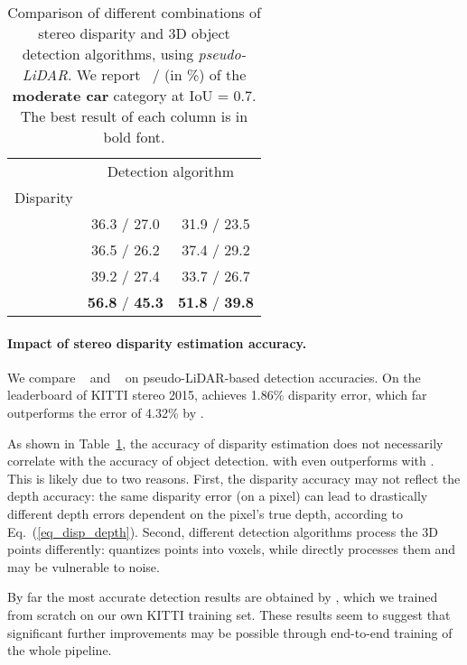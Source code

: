 \begin{table}
	\centering
	\caption{\small Comparison of different combinations of stereo disparity and 3D object detection algorithms, using \emph{pseudo-LiDAR}. We report \APBEV ~/ \AP (in \%) of the \textbf{moderate car} category at IoU = 0.7. The best result of each column is in bold font.} \label{tbDisp}
	\begin{tabular}{l|c|c}
		\multicolumn{1}{c|}{}  & \multicolumn{2}{c}{Detection algorithm} \\ \cline{2-3}
		\multicolumn{1}{c|}{Disparity} & \AVODGT & \Frustum \\ \hline
		\color{blue}\DispNetS &\color{blue} 36.3 / 27.0  &\color{blue} 31.9 / 23.5 \\
		\color{blue}\DispNetC  &\color{blue} 36.5 / 26.2 &\color{blue} 37.4 / 29.2\\
		\color{blue}\PSMNet  &\color{blue} 39.2 / 27.4 &\color{blue} 33.7 / 26.7 \\ \hline
		\color{blue}\PSMNetpd  &\color{blue} \textbf{56.8} / \textbf{45.3} &\color{blue} \textbf{51.8} / \textbf{39.8} \\
		\hline
	\end{tabular}
\end{table}

\paragraph{Impact of stereo disparity estimation accuracy.}

We compare \PSMNet~\cite{chang2018pyramid} and \DispNet~\cite{mayer2016large} on pseudo-LiDAR-based detection accuracies. On the leaderboard of KITTI stereo 2015, \PSMNet achieves 1.86\% disparity error, which far outperforms the error of 4.32\% by \DispNetC.

As shown in Table~\ref{tbDisp}, the accuracy of disparity estimation does not necessarily correlate with the accuracy of object detection. \Frustum with \DispNetC even outperforms \Frustum with \PSMNet.
This is likely due to two reasons. First, the disparity accuracy may not reflect the depth accuracy: the same disparity error (on a pixel) can lead to drastically different depth errors dependent on the pixel's true depth, according to Eq.~(\ref{eq_disp_depth}). Second, different detection algorithms process the 3D points differently: \AVOD quantizes points into voxels, while \Frustum directly processes them and may be vulnerable to noise. 

By far the most accurate detection results are obtained by \PSMNetpd, which we trained from scratch on our own KITTI training set.  These results seem to suggest that significant further improvements may be possible through  end-to-end training  of the whole pipeline. 


